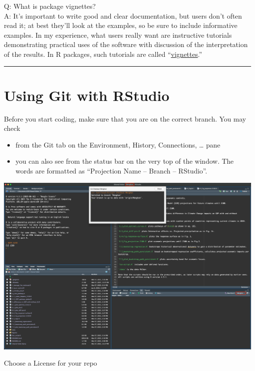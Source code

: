 \documentclass[
]{book}
\providecommand{\tightlist}{%
  \setlength{\itemsep}{0pt}\setlength{\parskip}{0pt}}
\theoremstyle{definition}
\theoremstyle{definition}
\theoremstyle{definition}
\theoremstyle{definition}
\theoremstyle{remark}
\begin{document}
Q: What is package vignettes?\\
A: It's important to write good and clear documentation, but users don't often read it; at best they'll look at the examples, so be sure to include informative examples. In my experience, what users really want are instructive tutorials demonstrating practical uses of the software with discussion of the interpretation of the results. In R packages, such tutorials are called ``\href{https://kbroman.org/pkg_primer/pages/vignettes.html}{vignettes}.''

\begin{center}\rule{0.5\linewidth}{0.5pt}\end{center}

\section{Using Git with RStudio}\label{using-git-with-rstudio}

Before you start coding, make sure that you are on the correct branch. You may check

\begin{itemize}
\tightlist
\item
  from the Git tab on the Environment, History, Connections, \ldots{} pane
\item
  you can also see from the status bar on the very top of the window. The words are formatted as ``Projection Name -- Branch -- RStudio''.
\end{itemize}

\includegraphics[width=1\linewidth]{images/R git branch}

Choose a License for your repo
\end{document}
